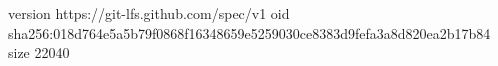 version https://git-lfs.github.com/spec/v1
oid sha256:018d764e5a5b79f0868f16348659e5259030ce8383d9fefa3a8d820ea2b17b84
size 22040
